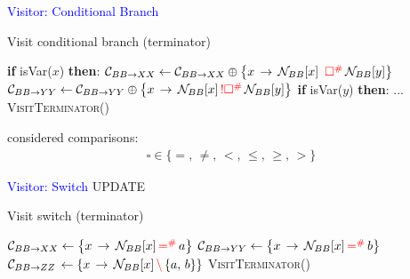 \begin{frame}[fragile]{\textcolor{blue}{Visitor: Conditional Branch}}


\begin{algorithm}[H]
\caption{Visit conditional branch (terminator)}
\begin{algorithmic}[1]
\State \textbf{if } isVar($x$) \textbf{then}:
\State \qquad$\mathcal{C}_{BB\rightarrow XX} \gets  \mathcal{C}_{BB\rightarrow XX} \oplus \left\lbrace  x\,\rightarrow\, \mathcal{N}_{BB}[x]\,\,\,{\color{red}\square^\#}\,\mathcal{N}_{BB}[y]
\right\rbrace$
\State \qquad$\mathcal{C}_{BB\rightarrow YY} \gets  \mathcal{C}_{BB\rightarrow YY} \oplus \left\lbrace  x\,\rightarrow\, \mathcal{N}_{BB}[x]\,{\color{red}!\square^\#}\,\mathcal{N}_{BB}[y]
\right\rbrace$
\State \textbf{if } isVar($y$) \textbf{then}:
\State \qquad ...
\State \textsc{VisitTerminator}()
\EndProcedure
\end{algorithmic}
\end{algorithm}
considered comparisons:
\begin{align*}
\square \in \{ =,\, \neq,\, < ,\,\le,\,\ge,\, > \}
\end{align*}




\end{frame}



\begin{frame}[fragile]{\textcolor{blue}{Visitor: Switch}}
{\Large UPDATE }

\begin{algorithm}[H]
\caption{Visit switch (terminator)}

\begin{algorithmic}[1]
\State $\mathcal{C}_{BB\rightarrow XX} \gets \left\lbrace  x\,\rightarrow\, \mathcal{N}_{BB}[x]\,{\color{red}=^\#}\,a
\right\rbrace$
\State $\mathcal{C}_{BB\rightarrow YY} \gets \left\lbrace  x\,\rightarrow\, \mathcal{N}_{BB}[x]\,{\color{red}=^\#}\,b
\right\rbrace$
\State $\mathcal{C}_{BB\rightarrow ZZ} \,\gets \left\lbrace  x\,\rightarrow\, \mathcal{N}_{BB}[x]\,{\color{red}\backslash}\,\{a,\,b\}
\right\rbrace$
\State \textsc{VisitTerminator}()
\EndProcedure
\end{algorithmic}
\end{algorithm}


\end{frame}


